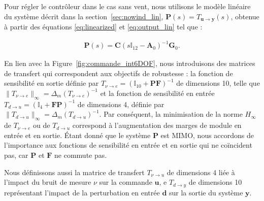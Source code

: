Pour régler le contrôleur dans le cas sans vent, nous utilisons le modèle linéaire du système décrit dans la section~\ref{sec:nowind_lin}, $\boldsymbol{P}(s) = T_{\boldsymbol{u} \rightarrow \boldsymbol{y}}(s)$, obtenue à partir des équations \eqref{eq:linearized} et \eqref{eq:output_lin} tel que :

\begin{align*}
    \boldsymbol{P}(s) = \boldsymbol{C} (s \mathbb{I}_{12} - \boldsymbol{A}_{0})^{-1} \boldsymbol{G}_{0}.
\end{align*} 

En lien avec la Figure~\ref{fig:commande_int6DOF}, nous introduisons des matrices de transfert qui correspondent aux objectifs de robustesse : la fonction de sensibilité en sortie définie par $T_{\nu \rightarrow e}=(\mathbb{I}_{10}+\boldsymbol{P}\boldsymbol{F})^{-1}$ de dimensions 10, telle que $\lVert T_{\nu \rightarrow e} \rVert _{\infty}=\Delta_m(T_{\nu \rightarrow e})^{-1} $ et la fonction de sensibilité en entrée $T_{d \rightarrow u}=(\mathbb{I}_{4}+\boldsymbol{F}\boldsymbol{P})^{-1}$ de dimensions 4, définie par $\lVert T_{d \rightarrow u} \rVert _{\infty}=\Delta_m(T_{d \rightarrow u})^{-1}$.
Par conséquent, la minimisation de la norme $H_{\infty}$ de $T_{\nu \rightarrow e}$ ou de $T_{d \rightarrow u}$ correspond à l'augmentation des marges de module en entrée et en sortie. Étant donné que le système $\boldsymbol{P}$ est MIMO, nous accordons de l'importance aux fonctions de sensibilité en entrée et en sortie qui ne coïncident pas, car $\boldsymbol{P}$ et $\boldsymbol{F}$ ne commute pas.

Nous définissons aussi la matrice de transfert $T_{\nu \rightarrow u}$ de dimensions 4 liée à l'impact du bruit de mesure $\nu$ sur la commande $\boldsymbol{u}$, e $T_{d \rightarrow y}$ de dimensions 10 représentant l'impact de la perturbation en entrée $\boldsymbol{d}$ sur la sortie du système $\boldsymbol{y}$. 

